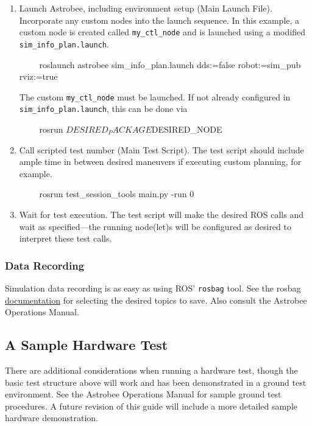 \documentclass{article}
\begin{document}
\begin{enumerate}
    \item Launch Astrobee, including environment setup (Main Launch File). Incorporate any custom nodes into the launch sequence. In this example, a custom node is created called \texttt{my\_ctl\_node} and is launched using a modified \texttt{sim\_info\_plan.launch}.
\begin{markdown}
~~~~
roslaunch astrobee sim_info_plan.launch dds:=false robot:=sim_pub rviz:=true
~~~~
\end{markdown}

The custom \texttt{my\_ctl\_node} must be launched. If not already configured in \texttt{sim\_info\_plan.launch}, this can be done via 

\begin{markdown}
~~~~
rosrun $DESIRED_PACKAGE $DESIRED_NODE
~~~~
\end{markdown}

\item Call scripted test number (Main Test Script). The test script should include ample time in between desired maneuvers if executing custom planning, for example.

\begin{markdown}
~~~~
rosrun test_session_tools main.py -run 0
~~~~
\end{markdown}

\item Wait for test execution. The test script will make the desired ROS calls and wait as specified---the running node(let)s will be configured as desired to interpret these test calls.
\end{enumerate}

\subsubsection{Data Recording}

Simulation data recording is as easy as using ROS' \texttt{rosbag} tool. See the rosbag \href{http://wiki.ros.org/rosbag}{documentation} for selecting the desired topics to save. Also consult the Astrobee Operations Manual.

\subsection{A Sample Hardware Test}

There are additional considerations when running a hardware test, though the basic test structure above will work and has been demonstrated in a ground test environment. See the Astrobee Operations Manual for sample ground test procedures. A future revision of this guide will include a more detailed sample hardware demonstration.
\end{document}

